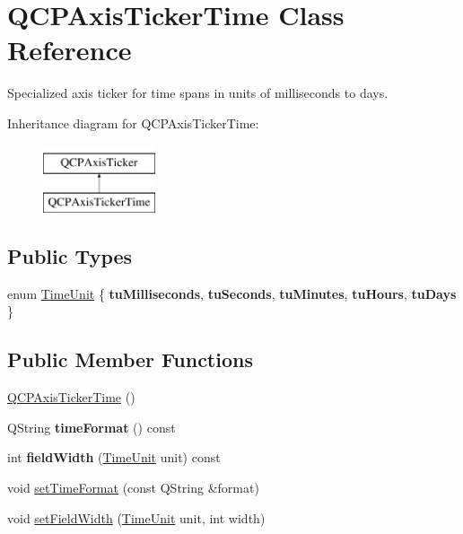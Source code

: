 \hypertarget{class_q_c_p_axis_ticker_time}{}\section{Q\+C\+P\+Axis\+Ticker\+Time Class Reference}
\label{class_q_c_p_axis_ticker_time}


Specialized axis ticker for time spans in units of milliseconds to days.  


Inheritance diagram for Q\+C\+P\+Axis\+Ticker\+Time\+:\begin{figure}[H]
\begin{center}
\leavevmode
\includegraphics[height=2.000000cm]{class_q_c_p_axis_ticker_time}
\end{center}
\end{figure}
\subsection*{Public Types}
\begin{DoxyCompactItemize}
\item 
enum \mbox{\hyperlink{class_q_c_p_axis_ticker_time_a5c48ded8c6d3a1aca9b68219469fea3e}{Time\+Unit}} \{ \newline
{\bfseries tu\+Milliseconds}, 
{\bfseries tu\+Seconds}, 
{\bfseries tu\+Minutes}, 
{\bfseries tu\+Hours}, 
\newline
{\bfseries tu\+Days}
 \}
\end{DoxyCompactItemize}
\subsection*{Public Member Functions}
\begin{DoxyCompactItemize}
\item 
\mbox{\hyperlink{class_q_c_p_axis_ticker_time_a5145aac1d2117fdac411d9e8552cc41b}{Q\+C\+P\+Axis\+Ticker\+Time}} ()
\item 
\mbox{\label{class_q_c_p_axis_ticker_time_a99ad61dc7434a7fed1850e96bf748834}} 
Q\+String {\bfseries time\+Format} () const
\item 
\mbox{\label{class_q_c_p_axis_ticker_time_a6b58a98e4d64c6764aa61a707e4a344d}} 
int {\bfseries field\+Width} (\mbox{\hyperlink{class_q_c_p_axis_ticker_time_a5c48ded8c6d3a1aca9b68219469fea3e}{Time\+Unit}} unit) const
\item 
void \mbox{\hyperlink{class_q_c_p_axis_ticker_time_a2f30b6e5125bce4256be9ce3177088ea}{set\+Time\+Format}} (const Q\+String \&format)
\item 
void \mbox{\hyperlink{class_q_c_p_axis_ticker_time_adc13e54fc969be98a5c0e3fa0dbaa293}{set\+Field\+Width}} (\mbox{\hyperlink{class_q_c_p_axis_ticker_time_a5c48ded8c6d3a1aca9b68219469fea3e}{Time\+Unit}} unit, int width)
\end{DoxyCompactItemize}
